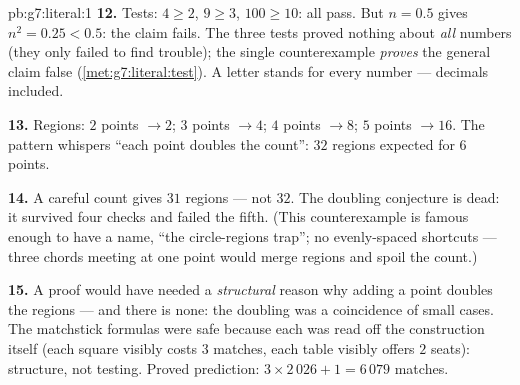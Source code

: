 \begin{solution}{pb:g7:literal:1}
\textbf{12.} Tests: $4 \geq 2$, $9 \geq 3$, $100 \geq 10$: all
pass. But $n = 0.5$ gives $n^2 = 0.25 < 0.5$: the claim fails.
The three tests proved nothing about \emph{all} numbers (they
only failed to find trouble); the single counterexample
\emph{proves} the general claim false
(\cref{met:g7:literal:test}). A letter stands for every number
--- decimals included.

\textbf{13.} Regions: $2$ points $\to 2$; $3$ points $\to 4$;
$4$ points $\to 8$; $5$ points $\to 16$. The pattern whispers
``each point doubles the count'': $32$ regions expected for
$6$ points.

\textbf{14.} A careful count gives $31$ regions --- not $32$.
The doubling conjecture is dead: it survived four checks and
failed the fifth. (This counterexample is famous enough to have
a name, ``the circle-regions trap''; no evenly-spaced shortcuts
--- three chords meeting at one point would merge regions and
spoil the count.)

\textbf{15.} A proof would have needed a \emph{structural}
reason why adding a point doubles the regions --- and there is
none: the doubling was a coincidence of small cases. The
matchstick formulas were safe because each was read off the
construction itself (each square visibly costs $3$ matches,
each table visibly offers $2$ seats): structure, not testing.
Proved prediction: $3 \times 2\,026 + 1 = 6\,079$ matches.
\end{solution}
